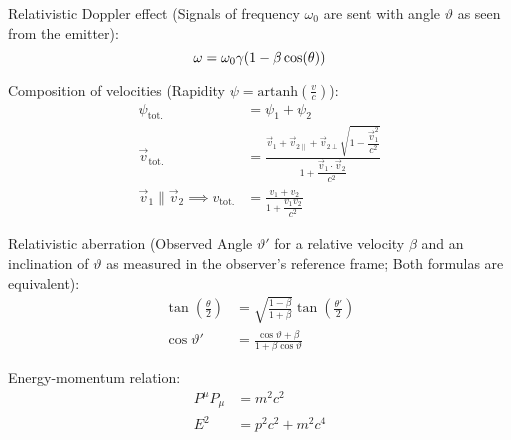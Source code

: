 			\noindent
			Relativistic Doppler effect (Signals of frequency $\omega_0$ are sent with angle $\vartheta$ as seen from the emitter):
			\begin{equation}
				\omega = \omega_0 \gamma \qty(1-\beta\cos(\theta))
			\end{equation}

			\noindent
			Composition of velocities (Rapidity $\psi = \mathrm{artanh}\left(\frac{v}{c}\right)$):
			\begin{equation}
				\begin{aligned}
					\psi_{\text{tot.}} &= \psi_1+\psi_2 \\
					\vec{v}_{\text{tot.}} &= \frac{\vec{v}_1+\vec{v}_{2\parallel}+\vec{v}_{2\perp}\sqrt{1-\dfrac{\vec{v}_1^2}{c^2}}}{1+\dfrac{\vec{v}_1\cdot\vec{v}_2}{c^2}} \\
					\vec{v}_1\parallel\vec{v}_2 \implies v_{\text{tot.}} &= \frac{v_1+v_2}{1+\dfrac{v_1 v_2}{c^2}}
				\end{aligned}
			\end{equation}

			\noindent
			Relativistic aberration (Observed Angle $\vartheta'$ for a relative velocity $\beta$ and an inclination of $\vartheta$ as measured in the observer's reference frame; Both formulas are equivalent):
			\begin{equation}
				\begin{aligned}
					\tan\left(\frac{\theta}{2}\right) &= \sqrt{\frac{1-\beta}{1+\beta}}\tan\left(\frac{\theta'}{2}\right)\\
					\cos\vartheta' &= \frac{\cos\vartheta+\beta}{1+\beta\cos\vartheta}
				\end{aligned}
			\end{equation}

			\noindent
			Energy-momentum relation:
			\begin{equation}
				\begin{aligned}
					P^\mu P_\mu &= m^2 c^2\\
					E^2 &= p^2 c^2 + m^2 c^4 \\
				\end{aligned}
			\end{equation}
			\newpage
